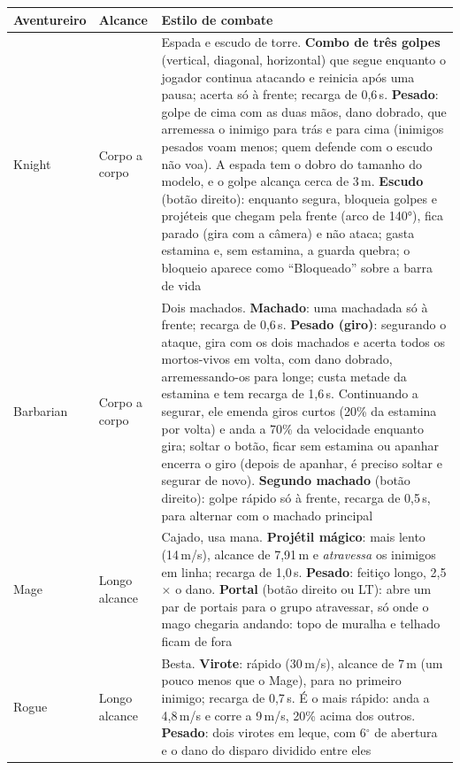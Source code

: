\documentclass[11pt,a4paper]{article}
\begin{document}
\begin{xltabular}{\textwidth}{@{}llX@{}}
\toprule
\textbf{Aventureiro} & \textbf{Alcance} & \textbf{Estilo de combate} \\
\midrule
Knight & Corpo a corpo & Espada e escudo de torre. \textbf{Combo de três golpes} (vertical, diagonal, horizontal) que segue enquanto o jogador continua atacando e reinicia após uma pausa; acerta só à frente; recarga de 0,6\,s. \textbf{Pesado}: golpe de cima com as duas mãos, dano dobrado, que arremessa o inimigo para trás e para cima (inimigos pesados voam menos; quem defende com o escudo não voa). A espada tem o dobro do tamanho do modelo, e o golpe alcança cerca de 3\,m. \textbf{Escudo} (botão direito): enquanto segura, bloqueia golpes e projéteis que chegam pela frente (arco de 140°), fica parado (gira com a câmera) e não ataca; gasta estamina e, sem estamina, a guarda quebra; o bloqueio aparece como ``Bloqueado'' sobre a barra de vida \\
Barbarian & Corpo a corpo & Dois machados. \textbf{Machado}: uma machadada só à frente; recarga de 0,6\,s. \textbf{Pesado (giro)}: segurando o ataque, gira com os dois machados e acerta todos os mortos-vivos em volta, com dano dobrado, arremessando-os para longe; custa metade da estamina e tem recarga de 1,6\,s. Continuando a segurar, ele emenda giros curtos (20\% da estamina por volta) e anda a 70\% da velocidade enquanto gira; soltar o botão, ficar sem estamina ou apanhar encerra o giro (depois de apanhar, é preciso soltar e segurar de novo). \textbf{Segundo machado} (botão direito): golpe rápido só à frente, recarga de 0,5\,s, para alternar com o machado principal \\
Mage & Longo alcance & Cajado, usa mana. \textbf{Projétil mágico}: mais lento (14\,m/s), alcance de 7,91\,m e \emph{atravessa} os inimigos em linha; recarga de 1,0\,s. \textbf{Pesado}: feitiço longo, 2,5$\times$ o dano. \textbf{Portal} (botão direito ou LT): abre um par de portais para o grupo atravessar, só onde o mago chegaria andando: topo de muralha e telhado ficam de fora \\
Rogue & Longo alcance & Besta. \textbf{Virote}: rápido (30\,m/s), alcance de 7\,m (um pouco menos que o Mage), para no primeiro inimigo; recarga de 0,7\,s. É o mais rápido: anda a 4,8\,m/s e corre a 9\,m/s, 20\% acima dos outros. \textbf{Pesado}: dois virotes em leque, com 6$^\circ$ de abertura e o dano do disparo dividido entre eles \\
\bottomrule
\end{xltabular}
\end{document}
